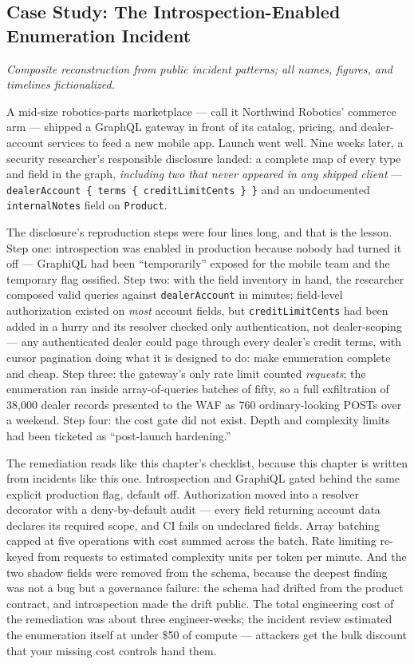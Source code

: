 \subsection{Case Study: The Introspection-Enabled Enumeration Incident}
\label{sec:ch12-casestudy}

\emph{Composite reconstruction from public incident patterns; all names,
figures, and timelines fictionalized.}

A mid-size robotics-parts marketplace --- call it Northwind Robotics'
commerce arm --- shipped a GraphQL gateway in front of its catalog,
pricing, and dealer-account services to feed a new mobile app. Launch
went well. Nine weeks later, a security researcher's responsible
disclosure landed: a complete map of every type and field in the graph,
\emph{including two that never appeared in any shipped client} ---
\texttt{dealerAccount \{ terms \{ creditLimitCents \} \}} and an
undocumented \texttt{internalNotes} field on \texttt{Product}.

The disclosure's reproduction steps were four lines long, and that is the
lesson. Step one: introspection was enabled in production because nobody
had turned it off --- GraphiQL had been ``temporarily'' exposed for the
mobile team and the temporary flag ossified. Step two: with the field
inventory in hand, the researcher composed valid queries against
\texttt{dealerAccount} in minutes; field-level authorization existed on
\emph{most} account fields, but \texttt{creditLimitCents} had been added
in a hurry and its resolver checked only authentication, not
dealer-scoping --- any authenticated dealer could page through every
dealer's credit terms, with cursor pagination doing what it is designed
to do: make enumeration complete and cheap. Step three: the gateway's
only rate limit counted \emph{requests}; the enumeration ran inside
array-of-queries batches of fifty, so a full exfiltration of 38{,}000
dealer records presented to the WAF as 760 ordinary-looking POSTs over a
weekend. Step four: the cost gate did not exist. Depth and complexity
limits had been ticketed as ``post-launch hardening.''

The remediation reads like this chapter's checklist, because this chapter
is written from incidents like this one. Introspection and GraphiQL gated
behind the same explicit production flag, default off. Authorization
moved into a resolver decorator with a deny-by-default audit --- every
field returning account data declares its required scope, and CI fails on
undeclared fields. Array batching capped at five operations with cost
summed across the batch. Rate limiting re-keyed from requests to
estimated complexity units per token per minute. And the two shadow
fields were removed from the schema, because the deepest finding was not
a bug but a governance failure: the schema had drifted from the product
contract, and introspection made the drift public. The total engineering
cost of the remediation was about three engineer-weeks; the incident
review estimated the enumeration itself at under \$50 of compute ---
attackers get the bulk discount that your missing cost controls hand
them.

